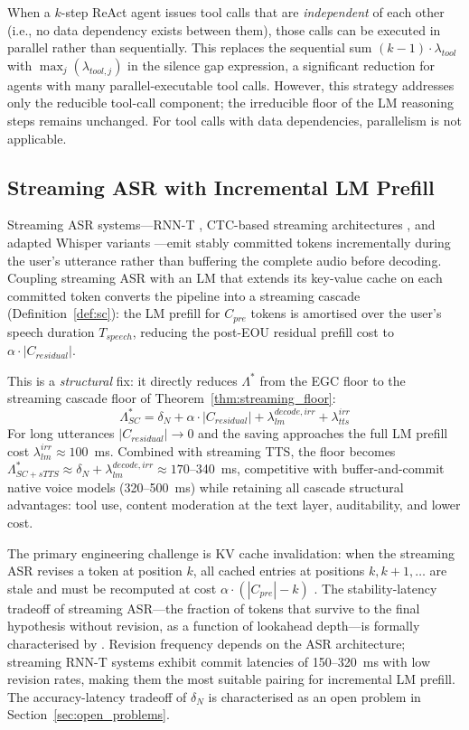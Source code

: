 When a $k$-step ReAct agent issues tool calls that are \emph{independent} of each other
(i.e., no data dependency exists between them),
those calls can be executed in parallel rather than sequentially.
This replaces the sequential sum $(k-1) \cdot \lambda_{tool}$
with $\max_j(\lambda_{tool,j})$ in the silence gap expression,
a significant reduction for agents with many parallel-executable tool calls.
However, this strategy addresses only the reducible tool-call component;
the irreducible floor of the LM reasoning steps remains unchanged.
For tool calls with data dependencies, parallelism is not applicable.

\subsection{Streaming ASR with Incremental LM Prefill}

Streaming ASR systems---RNN-T \citep{graves2012sequence}, CTC-based streaming architectures
\citep{yao2021wenet}, and adapted Whisper variants \citep{machacek2023whisper}---emit stably
committed tokens incrementally during the user's utterance rather than buffering the complete
audio before decoding.
Coupling streaming ASR with an LM that extends its key-value cache on each committed token
converts the pipeline into a streaming cascade (Definition~\ref{def:sc}):
the LM prefill for $C_{pre}$ tokens is amortised over the user's speech duration $T_{speech}$,
reducing the post-EOU residual prefill cost to $\alpha \cdot |C_{residual}|$.

This is a \emph{structural} fix: it directly reduces $\Lambda^*$ from the EGC floor to the
streaming cascade floor of Theorem~\ref{thm:streaming_floor}:
\begin{equation}
  \Lambda^*_{SC} = \delta_N + \alpha \cdot |C_{residual}| + \lambda_{lm}^{decode,irr}
                 + \lambda_{tts}^{irr}
\end{equation}
For long utterances $|C_{residual}| \to 0$ and the saving approaches the full LM prefill cost
$\lambda_{lm}^{irr} \approx 100$~ms.
Combined with streaming TTS, the floor becomes
$\Lambda^*_{SC+sTTS} \approx \delta_N + \lambda_{lm}^{decode,irr} \approx 170$--340~ms,
competitive with buffer-and-commit native voice models (320--500~ms) while retaining all
cascade structural advantages: tool use, content moderation at the text layer, auditability,
and lower cost.

The primary engineering challenge is KV cache invalidation: when the streaming ASR revises a
token at position $k$, all cached entries at positions $k, k+1, \ldots$ are stale and must be
recomputed at cost $\alpha \cdot (|C_{pre}| - k)$ \citep{xiao2023streamingllm}.
The stability-latency tradeoff of streaming ASR---the fraction of tokens that survive to the
final hypothesis without revision, as a function of lookahead depth---is formally characterised
by \citet{selfridge2011stability}.
Revision frequency depends on the ASR architecture; streaming RNN-T systems
\citep{sainath2020streaming} exhibit commit latencies of 150--320~ms with low revision rates,
making them the most suitable pairing for incremental LM prefill.
The accuracy-latency tradeoff of $\delta_N$ is characterised as an open problem in
Section~\ref{sec:open_problems}.

